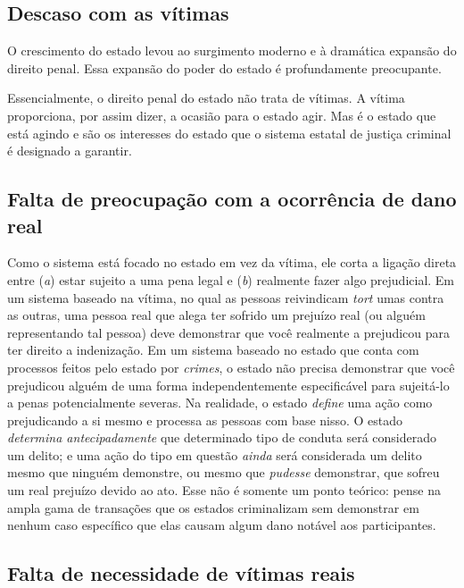 \subsection*{Descaso com as vítimas}

O crescimento do estado levou ao surgimento moderno e à dramática expansão do direito penal. Essa expansão do poder do estado é profundamente preocupante.

Essencialmente, o direito penal do estado não trata de vítimas. A vítima proporciona, por assim dizer, a ocasião para o estado agir. Mas é o estado que está agindo e são os interesses do estado que o sistema estatal de justiça criminal é designado a garantir.

\subsection*{Falta de preocupação com a ocorrência de dano real}

Como o sistema está focado no estado em vez da vítima, ele corta a ligação direta entre (\emph{a}) estar sujeito a uma pena legal e (\emph{b}) realmente fazer algo prejudicial. Em um sistema baseado na vítima, no qual as pessoas reivindicam \emph{tort} umas contra as outras, uma pessoa real que alega ter sofrido um prejuízo real (ou alguém representando tal pessoa) deve demonstrar que você realmente a prejudicou para ter direito a indenização. Em um sistema baseado no estado que conta com processos feitos pelo estado por \emph{crimes}, o estado não precisa demonstrar que você prejudicou alguém de uma forma independentemente especificável para sujeitá-lo a penas potencialmente severas. Na realidade, o estado \emph{define} uma ação como prejudicando a si mesmo e processa as pessoas com base nisso. O estado \emph{determina antecipadamente} que determinado tipo de conduta será considerado um delito; e uma ação do tipo em questão \emph{ainda} será considerada um delito mesmo que ninguém demonstre, ou mesmo que \emph{pudesse} demonstrar, que sofreu um real prejuízo devido ao ato. Esse não é somente um ponto teórico: pense na ampla gama de transações que os estados criminalizam sem demonstrar em nenhum caso específico que elas causam algum dano notável aos participantes.

\subsection*{Falta de necessidade de vítimas reais}

